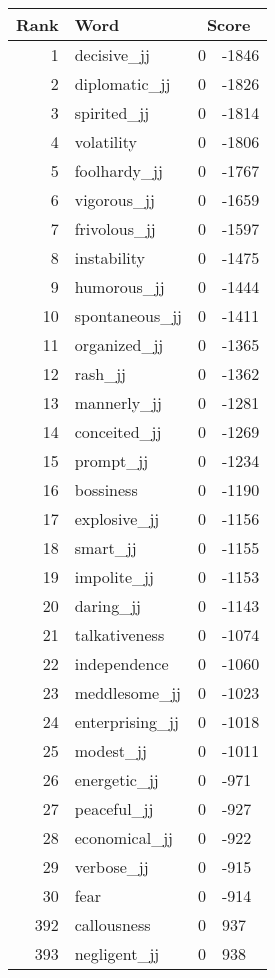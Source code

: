 \begin{longtable}[!htbp]{| rlr@{.}l |}
    \hline
    \textbf{Rank} & \textbf{Word} & \multicolumn{2}{c|}{\textbf{Score}} \\
    \hline
    \endhead
    1 & decisive\_jj & 0 & -1846 \\
    2 & diplomatic\_jj & 0 & -1826 \\
    3 & spirited\_jj & 0 & -1814 \\
    4 & volatility & 0 & -1806 \\
    5 & foolhardy\_jj & 0 & -1767 \\
    6 & vigorous\_jj & 0 & -1659 \\
    7 & frivolous\_jj & 0 & -1597 \\
    8 & instability & 0 & -1475 \\
    9 & humorous\_jj & 0 & -1444 \\
    10 & spontaneous\_jj & 0 & -1411 \\
    11 & organized\_jj & 0 & -1365 \\
    12 & rash\_jj & 0 & -1362 \\
    13 & mannerly\_jj & 0 & -1281 \\
    14 & conceited\_jj & 0 & -1269 \\
    15 & prompt\_jj & 0 & -1234 \\
    16 & bossiness & 0 & -1190 \\
    17 & explosive\_jj & 0 & -1156 \\
    18 & smart\_jj & 0 & -1155 \\
    19 & impolite\_jj & 0 & -1153 \\
    20 & daring\_jj & 0 & -1143 \\
    21 & talkativeness & 0 & -1074 \\
    22 & independence & 0 & -1060 \\
    23 & meddlesome\_jj & 0 & -1023 \\
    24 & enterprising\_jj & 0 & -1018 \\
    25 & modest\_jj & 0 & -1011 \\
    26 & energetic\_jj & 0 & -971 \\
    27 & peaceful\_jj & 0 & -927 \\
    28 & economical\_jj & 0 & -922 \\
    29 & verbose\_jj & 0 & -915 \\
    30 & fear & 0 & -914 \\
    392 & callousness & 0 & 937 \\
    393 & negligent\_jj & 0 & 938 \\

\end{longtable}
